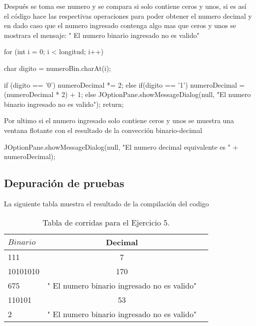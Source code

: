 Después se toma ese numero y se compara si solo contiene ceros y unos, si es así el código hace las respectivas operaciones para poder obtener el numero decimal y en dado caso que el numero ingresado contenga algo mas que ceros y unos se mostrara el mensaje: " El numero binario ingresado no es valido"

\begin{javaCode}
        for (int i = 0; i < longitud; i++) {
            
            char digito = numeroBin.charAt(i);
            
            if (digito == '0') {
                numeroDecimal *= 2;
            } else if(digito == '1') {
                numeroDecimal = (numeroDecimal * 2) + 1;
            } else {
                JOptionPane.showMessageDialog(null, "El numero binario ingresado no es valido");
                return;
            }
        }
\end{javaCode}

Por ultimo si el numero ingresado solo contiene ceros y unos se muestra una ventana flotante con el resultado de la convección binario-decimal

\begin{javaCode}
JOptionPane.showMessageDialog(null, "El numero decimal equivalente es " + numeroDecimal);
\end{javaCode}

\subsection{Depuración de pruebas}

La siguiente tabla muestra el resultado de la compilación del codigo
\begin{table}[h!]
  \centering
  \caption{Tabla de corridas para el Ejercicio 5.}
  \label{tab:tabla_ejemplo}
  \begin{tabular}{|l|c|r|}
    \hline
    \textbf{$Binario$} & \textbf{Decimal} \\
    \hline
    111 & 7 \\
    10101010 & 170 \\
    675 & " El numero binario ingresado no es valido" \\
    110101 & 53 \\
    2 & " El numero binario ingresado no es valido" \\
    
    \hline
  \end{tabular}
\end{table}